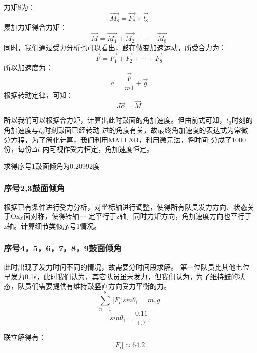 \documentclass[UTF8]{article}
\begin{document}
力矩8为：
\begin{equation}
\overrightarrow{M_8}=\overrightarrow{F_{8}}\times\overrightarrow{l_{8}}
\end{equation}
累加力矩得合力矩：
\begin{equation}
\overrightarrow{M}=\overrightarrow{M_1}+\overrightarrow{M_2}+\cdots+\overrightarrow{M_8}
\end{equation}
同时，我们通过受力分析也可以看出，鼓在做变加速运动，所受合力为：
\begin{equation}
\overrightarrow{F}=\overrightarrow{F_1}+\overrightarrow{F_2}+\cdots+\overrightarrow{F_8}
\end{equation}
所以加速度为：
\begin{equation}
\overrightarrow{a}=\frac{\overrightarrow{F}}{m1}+\overrightarrow{g}
\end{equation}
根据转动定律，可知：
\begin{equation}
J\overrightarrow{\alpha}=\overrightarrow{M}
\end{equation}

所以我们可以根据合力矩，计算出此时鼓面的角加速度。但由前式可知，$t_0$时刻的角加速度与$t_0$时刻鼓面已经转动
过的角度有关，故最终角加速度的表达式为常微分方程，为了简化计算，我们利用MATLAB，利用微元法，将时间t分成了1000 份，每份$\Delta t$ 内可视作受力恒定，角加速度恒定。

求得序号1鼓面倾角为0.20992度
\subsubsection{序号2,3鼓面倾角}

根据已有条件进行受力分析，对坐标轴进行调整，使得所有队员发力方向、状态关于Oxy面对称，使得转轴一
定平行于z轴，同时力矩方向，角加速度方向也平行于z轴。计算细节类似序号1情况。
\subsubsection{序号4，5，6，7，8，9鼓面倾角}
此时出现了发力时间不同的情况，故需要分时间段求解。
第一位队员比其他七位早发力0.1s，此时我们认为，其它队员虽未发力，但我们认为，为了维持鼓的状态，队员们需要提供有维持鼓竖直方向受力平衡的力。
\begin{equation}
\sum_{n=1}^8|F_i|sin\theta_1=m_1g
\end{equation}
\begin{equation}
sin\theta_1=\frac{0.11}{1.7}
\end{equation}

联立解得有：
\begin{equation}
|F_i|\approx64.2
\end{equation}
\end{document}
